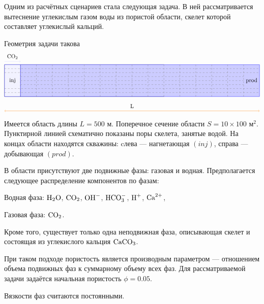 \documentclass[14pt,a4paper]{extarticle}
\begin{document}
Одним из расчётных сценариев стала следующая задача. В ней рассматривается вытеснение углекислым газом воды из пористой области, скелет которой составляет углекислый кальций. 

Геометрия задачи такова
$$
\tikz {
\draw (0,0) --  +(10,0) -- +(10,2) -- +(0, 2) -- +(0,0);
\filldraw[fill=blue!20!white, draw=blue] (1,0) --  (16,0) -- (16,2) -- (1, 2) -- (1,0);
\filldraw[fill=blue!5!white, draw=blue] (0,0) --  (1,0) -- (1,2) -- (0, 2) -- (0,0);
\draw[dashed, gray] (0,0.25) -- (16,0.25); 
\draw[dashed, gray] (0,0.5) -- (16,0.5); 
\draw[dashed, gray] (1,0.75) -- (15,0.75); 
\draw[dashed, gray] (1, 1) -- (15, 1);
\draw[dashed, gray] (1,1.25) -- (15,1.25); 
\draw[dashed, gray] (0,1.5) -- (16,1.5); 
\draw[dashed, gray] (0,1.75) -- (16,1.75);
\draw[dashed, gray] (1,0) -- (1,2); 
\draw[dashed, gray] (2,0) -- (2,2); 
\draw[dashed, gray] (3,0) -- (3,2); 
\draw[dashed, gray] (4,0) -- (4,2); 
\draw[dashed, gray] (5,0) -- (5,2); 
\draw[dashed, gray] (6,0) -- (6,2); 
\draw[dashed, gray] (7,0) -- (7,2); 
\draw[dashed, gray] (8,0) -- (8,2);
\draw[dashed, gray] (9,0) -- (9,2);
\draw[dashed, gray] (10,0) -- (10,2); 
\draw[dashed, gray] (11,0) -- (11,2); 
\draw[dashed, gray] (12,0) -- (12,2); 
\draw[dashed, gray] (13,0) -- (13,2); 
\draw[dashed, gray] (14,0) -- (14,2); 
\draw[dashed, gray] (15,0) -- (15,2);
\draw [<->, orange] (0, -0.9) -- (16, -0.9); 
\draw [->, blue!20!white] (0, 2.2) -- (1, 2.2);
\fill
(0.5,1) node {inj}
(15.5,1) node {prod} 
(8,-0.6) node {L}
(0.5, 2.5) node {$\CARB$}
}
$$
Имеется область длины $L = 500 \text{ м}$. Поперечное сечение области $S = 10\times100 \text{ м}^2$. Пунктирной линией схематично показаны поры скелета, занятые водой. На концах области находятся скважины: cлева --- нагнетающая $(inj)$, справа --- добывающая $(prod)$. 

В области присутствуют две подвижные фазы: газовая и водная.
Предполагается следующее распределение компонентов по фазам:

Водная фаза: $ \text{H}_2\text{O}$, $ \text{CO}_2$, $ \text{OH}^-$, $ \text{HCO}_3^{-}$, $ \text{H}^+$, $ \text{Ca}^{2+}$,

Газовая фаза: $\text{CO}_2 $.

Кроме того, существует только одна неподвижная фаза, описывающая скелет и состоящая из углекислого кальция $\text{CaCO}_3$.

При таком подходе пористость является производным параметром — отношением объема подвижных фаз к суммарному объему всех фаз.
Для рассматриваемой задачи задаётся начальная пористость $\phi = 0.05$.

Вязкости фаз считаются постоянными. 
\end{document}
